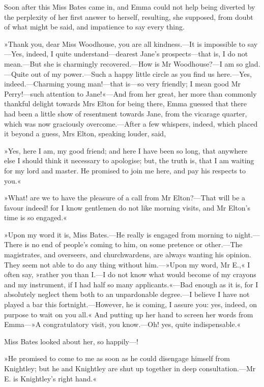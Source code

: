 Soon after this Miss Bates came in, and Emma could not help being diverted by the perplexity of her first answer to herself, resulting, she supposed, from doubt of what might be said, and impatience to say every thing.

»Thank you, dear Miss Woodhouse, you are all kindness.—It is impossible to say—Yes, indeed, I quite understand—dearest Jane's prospects—that is, I do not mean.—But she is charmingly recovered.—How is Mr Woodhouse?—I am so glad.—Quite out of my power.—Such a happy little circle as you find us here.—Yes, indeed.—Charming young man!—that is—so very friendly; I mean good Mr Perry!—such attention to Jane!«—And from her great, her more than commonly thankful delight towards Mrs Elton for being there, Emma guessed that there had been a little show of resentment towards Jane, from the vicarage quarter, which was now graciously overcome.—After a few whispers, indeed, which placed it beyond a guess, Mrs Elton, speaking louder, said,

»Yes, here I am, my good friend; and here I have been so long, that anywhere else I should think it necessary to apologise; but, the truth is, that I am waiting for my lord and master. He promised to join me here, and pay his respects to you.«

»What! are we to have the pleasure of a call from Mr Elton?—That will be a favour indeed! for I know gentlemen do not like morning visits, and Mr Elton's time is so engaged.«

»Upon my word it is, Miss Bates.—He really is engaged from morning to night.—There is no end of people's coming to him, on some pretence or other.—The magistrates, and overseers, and churchwardens, are always wanting his opinion. They seem not able to do any thing without him.—»Upon my word, Mr E.,« I often say, »rather you than I.—I do not know what would become of my crayons and my instrument, if I had half so many applicants.«—Bad enough as it is, for I absolutely neglect them both to an unpardonable degree.—I believe I have not played a bar this fortnight.—However, he is coming, I assure you: yes, indeed, on purpose to wait on you all.« And putting up her hand to screen her words from Emma—»A congratulatory visit, you know.—Oh! yes, quite indispensable.«

Miss Bates looked about her, so happily—!

»He promised to come to me as soon as he could disengage himself from Knightley; but he and Knightley are shut up together in deep consultation.—Mr E. is Knightley's right hand.«

